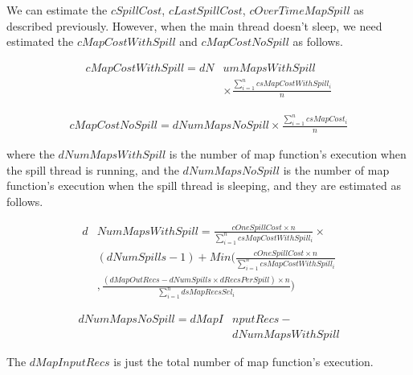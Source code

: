 We can estimate the $cSpillCost$, $cLastSpillCost$, $cOverTimeMapSpill$ as described previously. However, when the main thread doesn't sleep, we need estimated the $cMapCostWithSpill$ and $cMapCostNoSpill$ as follows.
\begin{small}
\begin{equation}
\begin{split}
cMapCostWithSpill=dN&umMapsWithSpill \\
&\times\frac{\sum_{i=1}^ncsMapCostWithSpill_i}{n} \nonumber
\end{split}
\end{equation}
\end{small}
\begin{small}	
\begin{equation}
\begin{split}
cMapCostNoSpill=dNumMapsNoSpill\times \frac{\sum_{i=1}^n csMapCost_i}{n} \nonumber
\end{split}
\end{equation}
\end{small}
where the $dNumMapsWithSpill$ is the number of map function's execution when the spill thread is running, and the $dNumMapsNoSpill$ is the number of map function's execution when the spill thread is sleeping, and they are estimated as follows.
\begin{small}
\begin{equation}
\begin{split}
d&NumMapsWithSpill=\frac{cOneSpillCost\times n}{\sum_{i=1}^n csMapCostWithSpill_i} \times \\
&(dNumSpills-1)+Min( \frac{cOneSpillCost\times n}{\sum_{i=1}^n csMapCostWithSpill_i} \\
&, \frac{(dMapOutRecs-dNumSpills\times dRecsPerSpill)\times n}{\sum_{i=1}^ndsMapRecsSel_i})  \nonumber
\end{split}
\end{equation}
\end{small}
\begin{small}
\begin{equation}
\begin{split}
dNumMapsNoSpill=dMapI&nputRecs-	\\
				&dNumMapsWithSpill \nonumber
\end{split}
\end{equation}
\end{small}
The $dMapInputRecs$ is just the total number of map function's execution.



